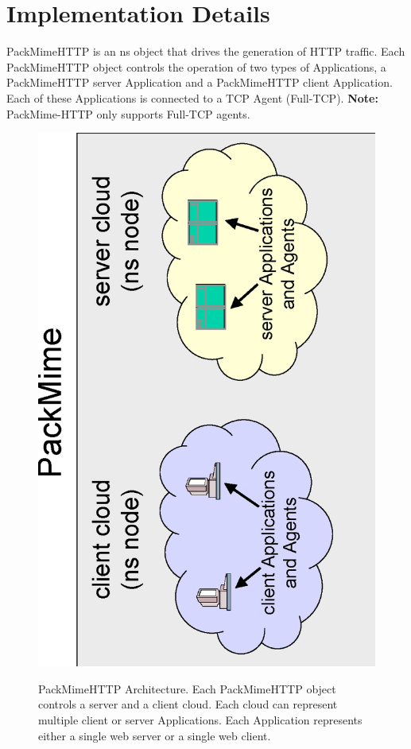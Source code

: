 \section{Implementation Details}
PackMimeHTTP is an ns object that drives the generation of HTTP
traffic. Each PackMimeHTTP object controls the operation of two types
of Applications, a PackMimeHTTP server Application and a PackMimeHTTP
client Application. Each of these Applications is connected to a TCP
Agent (Full-TCP).   {\bf Note:} PackMime-HTTP only supports Full-TCP
agents. 

\begin{figure}
\centering
\includegraphics[scale=0.5, angle=270, clip]{figures/packmime.eps}
\label{fig-pm}
\caption{PackMimeHTTP Architecture. Each PackMimeHTTP object controls
a server and a client cloud. Each cloud can represent multiple client
or server Applications. Each Application represents either a single
web server or a single web client.} 
\end{figure}  

